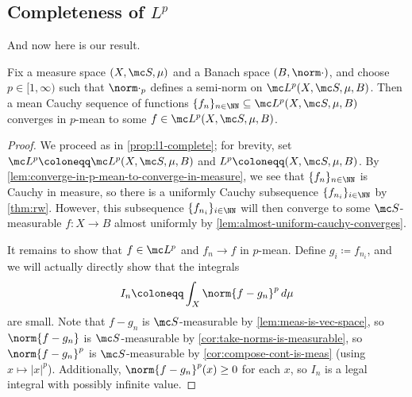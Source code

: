 \documentclass[../notes.tex]{subfiles}
\begin{document}
\subsection{Completeness of \texorpdfstring{$L^p$}{ Lp}}
And now here is our result.
\begin{theorem} \label{thm:lp-complete}
	Fix a measure space $(X,\mc S,\mu)$ and a Banach space $(B,\norm\cdot)$, and choose $p\in[1,\infty)$ such that $\norm\cdot_p$ defines a semi-norm on $\mc L^p(X,\mc S,\mu,B)$. Then a mean Cauchy sequence of functions $\{f_n\}_{n\in\NN}\subseteq\mc L^p(X,\mc S,\mu,B)$ converges in $p$-mean to some $f\in\mc L^p(X,\mc S,\mu,B)$.
\end{theorem}
\begin{proof}
	We proceed as in \autoref{prop:l1-complete}; for brevity, set $\mc L^p\coloneqq\mc L^p(X,\mc S,\mu,B)$ and $L^p\coloneqq(X,\mc S,\mu,B)$. By \autoref{lem:converge-in-p-mean-to-converge-in-measure}, we see that $\{f_n\}_{n\in\NN}$ is Cauchy in measure, so there is a uniformly Cauchy subsequence $\{f_{n_i}\}_{i\in\NN}$ by \autoref{thm:rw}. However, this subsequence $\{f_{n_i}\}_{i\in\NN}$ will then converge to some $\mc S$-measurable $f\colon X\to B$ almost uniformly by \autoref{lem:almost-uniform-cauchy-converges}.
	
	It remains to show that $f\in\mc L^p$ and $f_n\to f$ in $p$-mean. Define $g_i\coloneqq f_{n_i}$, and we will actually directly show that the integrals
	\[I_n\coloneqq\int_X\norm{f-g_n}^p\,d\mu\]
	are small. Note that $f-g_n$ is $\mc S$-measurable by \autoref{lem:meas-is-vec-space}, so $\norm{f-g_n}$ is $\mc S$-measurable by \autoref{cor:take-norms-is-measurable}, so $\norm{f-g_n}^p$ is $\mc S$-measurable by \autoref{cor:compose-cont-is-meas} (using $x\mapsto|x|^p$). Additionally, $\norm{f-g_n}^p(x)\ge0$ for each $x$, so $I_n$ is a legal integral with possibly infinite value.


\end{proof}
\end{document}
